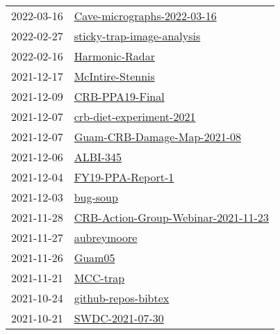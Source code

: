 \begin{longtable}{ll}
2022-03-16 &                   \href{https://github.com/aubreymoore/Cave-micrographs-2022-03-16}{Cave-micrographs-2022-03-16} \\
2022-02-27 &                     \href{https://github.com/aubreymoore/sticky-trap-image-analysis}{sticky-trap-image-analysis} \\
2022-02-16 &                                             \href{https://github.com/aubreymoore/Harmonic-Radar}{Harmonic-Radar} \\
2021-12-17 &                                         \href{https://github.com/aubreymoore/McIntire-Stennis}{McIntire-Stennis} \\
2021-12-09 &                                           \href{https://github.com/aubreymoore/CRB-PPA19-Final}{CRB-PPA19-Final} \\
2021-12-07 &                         \href{https://github.com/aubreymoore/crb-diet-experiment-2021}{crb-diet-experiment-2021} \\
2021-12-07 &                   \href{https://github.com/aubreymoore/Guam-CRB-Damage-Map-2021-08}{Guam-CRB-Damage-Map-2021-08} \\
2021-12-06 &                                                         \href{https://github.com/aubreymoore/ALBI-345}{ALBI-345} \\
2021-12-04 &                                       \href{https://github.com/aubreymoore/FY19-PPA-Report-1}{FY19-PPA-Report-1} \\
2021-12-03 &                                                         \href{https://github.com/aubreymoore/bug-soup}{bug-soup} \\
2021-11-28 &   \href{https://github.com/aubreymoore/CRB-Action-Group-Webinar-2021-11-23}{CRB-Action-Group-Webinar-2021-11-23} \\
2021-11-27 &                                                   \href{https://github.com/aubreymoore/aubreymoore}{aubreymoore} \\
2021-11-26 &                                                             \href{https://github.com/aubreymoore/Guam05}{Guam05} \\
2021-11-21 &                                                         \href{https://github.com/aubreymoore/MCC-trap}{MCC-trap} \\
2021-10-24 &                                   \href{https://github.com/aubreymoore/github-repos-bibtex}{github-repos-bibtex} \\
2021-10-21 &                                           \href{https://github.com/aubreymoore/SWDC-2021-07-30}{SWDC-2021-07-30} \\

\end{longtable}
